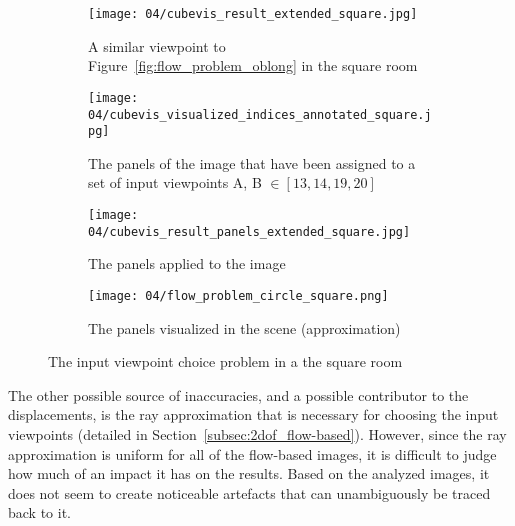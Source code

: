 \begin{figure}
\centering
    \hfill
    \begin{subfigure}[c]{0.45\textwidth}
            \centering
            \texttt{[image: 04/cubevis\_result\_extended\_square.jpg]}
            \caption{A similar viewpoint to Figure~\ref{fig:flow_problem_oblong} in the square room}
    \end{subfigure}
    \hfill
    \begin{subfigure}[c]{0.45\textwidth}
            \centering
            \texttt{[image: 04/cubevis\_visualized\_indices\_annotated\_square.jpg]}
            \caption{The panels of the image that have been assigned to a set of input viewpoints A, B $\in [13, 14, 19, 20]$}
    \end{subfigure}
    \hfill

    \hfill
    \begin{subfigure}[c]{0.45\textwidth}
            \centering
            \texttt{[image: 04/cubevis\_result\_panels\_extended\_square.jpg]}
            \caption{The panels applied to the image}
    \end{subfigure}
    \hfill
    \begin{subfigure}[c]{0.45\textwidth}
            \centering
            \texttt{[image: 04/flow\_problem\_circle\_square.png]}
            \caption{The panels visualized in the scene (approximation)}
    \end{subfigure}
    \hfill
  \caption{The input viewpoint choice problem in a the square room}
  \label{fig:flow_problem_square}
\end{figure}

The other possible source of inaccuracies, and a possible contributor to the displacements, is the ray approximation that is necessary for choosing the input viewpoints (detailed in Section~\ref{subsec:2dof_flow-based}). However, since the ray approximation is uniform for all of the flow-based images, it is difficult to judge how much of an impact it has on the results. Based on the analyzed images, it does not seem to create noticeable artefacts that can unambiguously be traced back to it.



















